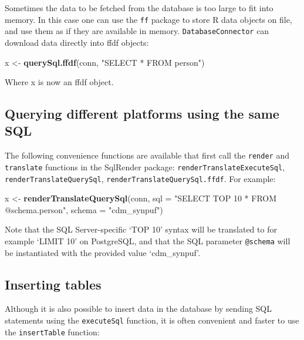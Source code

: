 \documentclass[11pt]{book}
\newenvironment{Shaded}{\begin{snugshade}}{\end{snugshade}}
\newcommand{\KeywordTok}[1]{\textcolor[rgb]{0.13,0.29,0.53}{\textbf{#1}}}
\newcommand{\DataTypeTok}[1]{\textcolor[rgb]{0.13,0.29,0.53}{#1}}
\newcommand{\StringTok}[1]{\textcolor[rgb]{0.31,0.60,0.02}{#1}}
\newcommand{\NormalTok}[1]{#1}
\begin{document}
Sometimes the data to be fetched from the database is too large to fit
into memory. In this case one can use the \texttt{ff} package to store R
data objects on file, and use them as if they are available in memory.
\texttt{DatabaseConnector} can download data directly into ffdf objects:

\begin{Shaded}
\begin{Highlighting}[]
\NormalTok{x <-}\StringTok{ }\KeywordTok{querySql.ffdf}\NormalTok{(conn, }\StringTok{"SELECT * FROM person"}\NormalTok{)}
\end{Highlighting}
\end{Shaded}

Where x is now an ffdf object.

\subsection{Querying different platforms using the same
SQL}\label{querying-different-platforms-using-the-same-sql}

The following convenience functions are available that first call the
\texttt{render} and \texttt{translate} functions in the SqlRender
package: \texttt{renderTranslateExecuteSql},
\texttt{renderTranslateQuerySql}, \texttt{renderTranslateQuerySql.ffdf}.
For example:

\begin{Shaded}
\begin{Highlighting}[]
\NormalTok{x <-}\StringTok{ }\KeywordTok{renderTranslateQuerySql}\NormalTok{(conn, }
                             \DataTypeTok{sql =} \StringTok{"SELECT TOP 10 * FROM @schema.person"}\NormalTok{,}
                             \DataTypeTok{schema =} \StringTok{"cdm_synpuf"}\NormalTok{)}
\end{Highlighting}
\end{Shaded}

Note that the SQL Server-specific `TOP 10' syntax will be translated to
for example `LIMIT 10' on PostgreSQL, and that the SQL parameter
\texttt{@schema} will be instantiated with the provided value
`cdm\_synpuf'.

\subsection{Inserting tables}\label{inserting-tables}

Although it is also possible to insert data in the database by sending
SQL statements using the \texttt{executeSql} function, it is often
convenient and faster to use the \texttt{insertTable} function:
\end{document}
